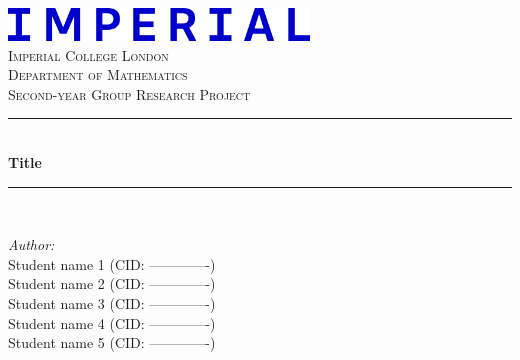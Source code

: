 \documentclass[a4paper,11pt, titlepage]{article}
\theoremstyle{definition}
\theoremstyle{plain}
\theoremstyle{remark}
\newcommand{\reporttitle}{Title} %
\newcommand{\reportauthorA}{Student name 1 (CID: -------------)} %
\newcommand{\reportauthorB}{Student name 2 (CID: -------------)} %
\newcommand{\reportauthorC}{Student name 3 (CID: -------------)} %
\newcommand{\reportauthorD}{Student name 4 (CID: -------------)} %
\newcommand{\reportauthorE}{Student name 5 (CID: -------------)} %
\begin{document}
\begin{titlepage}
\newcommand{\HRule}{\rule{\linewidth}{0.5mm}} %
\includegraphics[width=8cm]{Imperial_logo.png}\\[1cm] %
\center %
\textsc{\LARGE Imperial College London}\\[0.5cm] 
\textsc{\Large Department of Mathematics}\\[1.5cm] 
\textsc{\Large Second-year Group Research Project}\\[0.5cm]
\makeatletter
\HRule \\[0.6cm]
{ \huge \bfseries \reporttitle}\\[0.6cm] %
\HRule \\[1.5cm]
\begin{minipage}{0.4\textwidth}
\begin{flushleft} \large
\emph{Author:}\\
\reportauthorA \\
\reportauthorB \\
\reportauthorC \\
\reportauthorD \\
\reportauthorE
\end{flushleft}
\end{minipage}

\end{titlepage}
\end{document}
